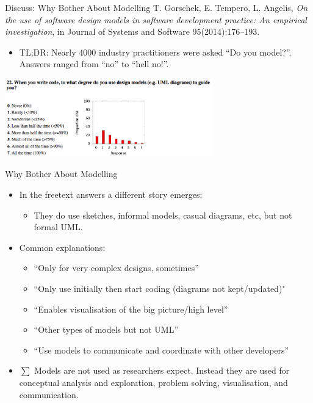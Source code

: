 \documentclass[10pt,t,a4paper]{beamer}
\begin{document}
\begin{frame}[label=sec-8]{Discuss: Why Bother About Modelling}
T. Gorschek, E. Tempero, L. Angelis, \emph{On the use of software design models in software development practice: An empirical investigation}, in Journal of Systems and Software 95(2014):176--193.

\begin{itemize}
\item TL;DR: Nearly 4000 industry practitioners were asked ``Do you model?''. Answers ranged from ``no'' to ``hell no!''.
\end{itemize}
 \vspace{0.25cm}
\includegraphics[width=9cm]{./ISurveyModelling.png}
\end{frame}
\begin{frame}[label=sec-9]{Why Bother About Modelling}
\begin{itemize}
\item In the freetext answers a different story emerges:
\begin{itemize}
\item They do use sketches, informal models, casual diagrams, etc, but not formal UML.
\end{itemize}
\item Common explanations:
\begin{itemize}
\item ``Only for very complex designs, sometimes''
\item ``Only use initially then start coding (diagrams not kept/updated)"
\item ``Enables visualisation of the big picture/high level''
\item ``Other types of models but not UML''
\item ``Use models to communicate and coordinate with other developers''
\end{itemize}
\item $\sum$ Models are not used as researchers expect. Instead they are used for \alert{conceptual analysis and exploration, problem solving, visualisation, and communication.}
\end{itemize}
\end{frame}
\end{document}
